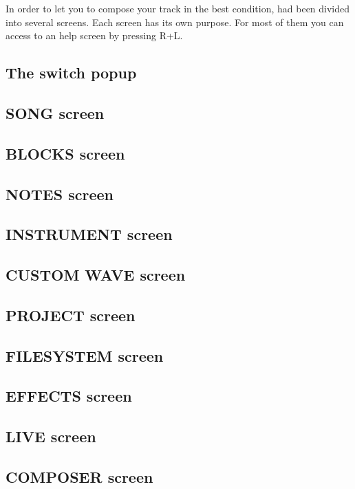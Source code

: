In order to let you to compose your track in the best condition, \FAT had been divided into several screens.
Each screen has its own purpose. For most of them you can access to an help screen by pressing R+L.

\subsection{The switch popup}


\subsection{SONG screen}


\subsection{BLOCKS screen}


\subsection{NOTES screen}


\subsection{INSTRUMENT screen}


\subsection{CUSTOM WAVE screen}


\subsection{PROJECT screen}


\subsection{FILESYSTEM screen}


\subsection{EFFECTS screen}


\subsection{LIVE screen}


\subsection{COMPOSER screen}

